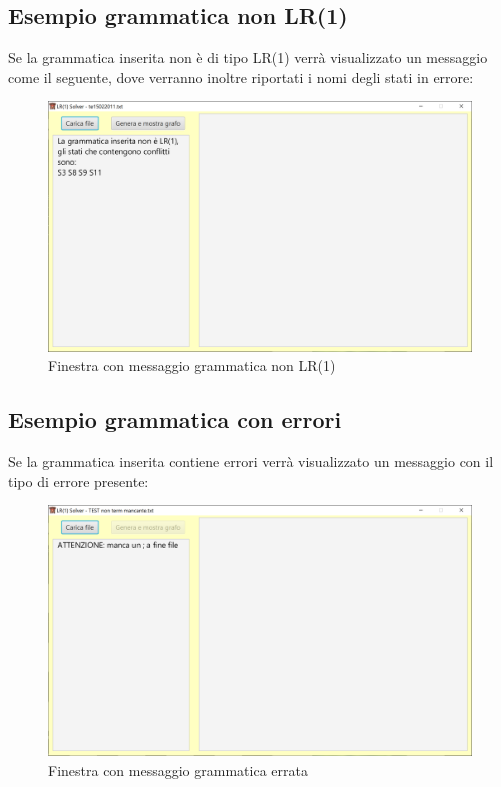\documentclass[12pt]{article}
\begin{document}
\subsection{Esempio grammatica non LR(1)}
Se la grammatica inserita non è di tipo LR(1) verrà visualizzato un messaggio come il seguente, dove verranno inoltre riportati i nomi degli stati in errore:
\begin{figure}[h!]
\centering
\includegraphics[scale=0.5]{immagini/GrammaticaNoLR1.png}
\caption{Finestra con messaggio grammatica non LR(1)}
\end{figure}
\pagebreak

\subsection{Esempio grammatica con errori}
Se la grammatica inserita contiene errori verrà visualizzato un messaggio con il tipo di errore presente:
\begin{figure}[h!]
\centering
\includegraphics[scale=0.5]{immagini/GrammaticaErrata.png}
\caption{Finestra con messaggio grammatica errata}
\end{figure}
\end{document}
